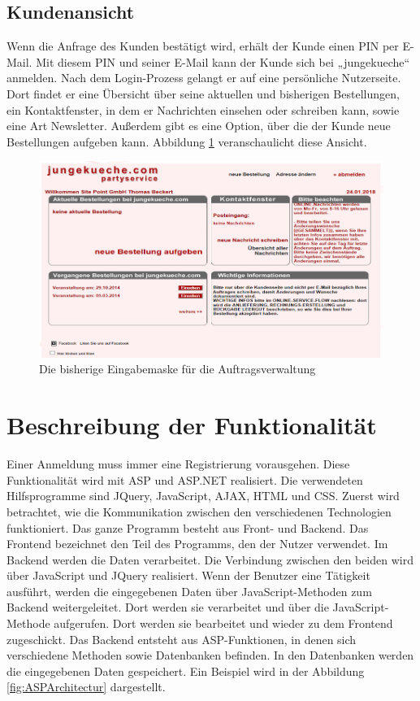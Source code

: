 \subsection{Kundenansicht}

Wenn die Anfrage des Kunden bestätigt wird, erhält der Kunde einen PIN per E-Mail. Mit diesem PIN und seiner E-Mail kann der Kunde sich bei „jungekueche“ anmelden. Nach dem Login-Prozess gelangt er auf eine persönliche Nutzerseite. Dort findet er eine Übersicht über seine aktuellen und bisherigen Bestellungen, ein Kontaktfenster, in dem er Nachrichten einsehen oder schreiben kann, sowie eine Art Newsletter. Außerdem gibt es eine Option, über die der Kunde neue Bestellungen aufgeben kann. Abbildung \ref{fig:KundenAnsicht} veranschaulicht diese Ansicht. 

\begin{figure}[h]
	\centering
	\includegraphics[width=0.7\linewidth]{Graphics/KundenAnsicht.png}
	\caption[Kundeansicht]{Die bisherige Eingabemaske für die Auftragsverwaltung}
	\label{fig:KundenAnsicht}
\end{figure}

\section{Beschreibung der Funktionalität}   

Einer Anmeldung muss immer eine Registrierung vorausgehen. Diese Funktionalität wird mit ASP und ASP.NET realisiert. Die verwendeten Hilfsprogramme sind JQuery, JavaScript, AJAX, HTML und CSS.
Zuerst wird betrachtet, wie die Kommunikation zwischen den verschiedenen Technologien funktioniert. Das ganze Programm besteht aus Front- und Backend. Das Frontend bezeichnet den Teil des Programms, den der Nutzer verwendet. Im Backend werden die Daten verarbeitet. Die Verbindung zwischen den beiden wird über JavaScript und JQuery realisiert. Wenn der Benutzer eine Tätigkeit ausführt, werden die eingegebenen Daten über JavaScript-Methoden zum Backend weitergeleitet. Dort werden sie verarbeitet und über die JavaScript-Methode aufgerufen. Dort werden sie bearbeitet und wieder zu dem Frontend zugeschickt. Das Backend entsteht aus ASP-Funktionen, in denen sich verschiedene Methoden sowie Datenbanken befinden. In den Datenbanken werden die eingegebenen Daten gespeichert. Ein Beispiel wird in der Abbildung \ref{fig:ASPArchitectur} dargestellt.

